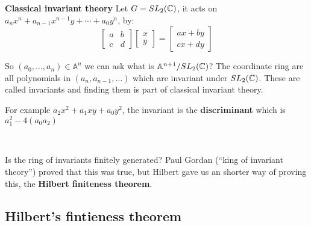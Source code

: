 \begin{example}\textbf{Classical invariant theory}
Let $G = SL_2(\mathbb{C})$, it acts on ${a_n}x^n + {a_{n-1}}x^{n-1}y+\cdots + a_0y^n$, by:\[\begin{bmatrix}
    a & b\\c&d
\end{bmatrix}\begin{bmatrix}
    x\\y
\end{bmatrix} = \begin{bmatrix}
    ax+by\\cx+dy
\end{bmatrix}\]

So $(a_0,\dots,a_n)\in \mathbb{A}^n$ we can ask what is $\mathbb{A}^{n+1}/SL_2(\mathbb{C})$? The coordinate ring are all polynomials in $(a_n,a_{n-1},\dots)$ which are invariant under $SL_2(\mathbb{C})$. These are called invariants and finding them is part of classical invariant theory.

For example $a_2x^2+a_1xy+a_0y^2$, the invariant is the \textbf{discriminant} which is $a_1^2-4({a_0}{a_2})$

\

Is the ring of invariants finitely generated? Paul Gordan (``king of invariant theory'') proved that this was true, but Hilbert gave us an shorter way of proving this, the \textbf{Hilbert finiteness theorem}. 

\end{example}

\subsection{Hilbert's fintieness theorem}

